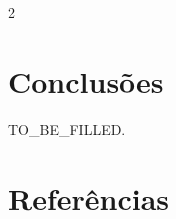\documentclass[10pt,a4paper]{article}
\begin{document}
\begin{multicols}{2}
\section{Conclusões}

%

TO\_BE\_FILLED.

%
%
%
%
%
%
%



\section{Referências}

%
%
%

\begin{enumerate}[
    label=\arabic*.,
    leftmargin=*,
    itemsep=2pt
]


\end{enumerate}



\end{multicols}
\end{document}

